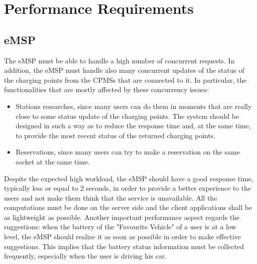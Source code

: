 \documentclass{Configuration_Files/PoliMi3i_thesis}
\begin{document}
\newpage
\section{Performance Requirements}

\subsection{eMSP}

The eMSP must be able to handle a high number of concurrent requests. In addition, the eMSP must handle also many concurrent updates of the status of the charging points from the CPMSs that are connected to it. In particular, the functionalities that are mostly affected by these concurrency issues:
\begin{itemize}
    \item Stations researches, since many users can do them in moments that are really close to some status update of the charging points. The system should be designed in such a way as to reduce the response time and, at the same time, to provide the most recent status of the returned charging points.
    \item Reservations, since many users can try to make a reservation on the same socket at the same time.
\end{itemize}
Despite the expected high workload, the eMSP should have a good response time, typically less or equal to 2 seconds, in order to provide a better experience to the users and not make them think that the service is unavailable. All the computations must be done on the server side and the client applications shall be as lightweight as possible. \newline
Another important performance aspect regards the suggestions: when the battery of the "Favourite Vehicle" of a user is at a low level, the eMSP should realize it as soon as possible in order to make effective suggestions. This implies that the battery status information must be collected frequently, especially when the user is driving his car.
\end{document}
